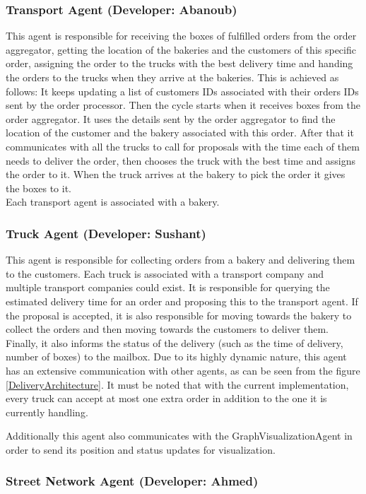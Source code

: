 \documentclass[11pt, a4paper]{article}
\begin{document}
\subsubsection{Transport Agent (Developer: Abanoub)}
This agent is responsible for receiving the boxes of fulfilled orders from the order aggregator, getting the location of the bakeries and the customers of this specific order, assigning the order to the trucks with the best delivery time and handing the orders to the trucks when they arrive at the bakeries. This is achieved as follows: It keeps updating a list of customers IDs associated with their orders IDs sent by the order processor. Then the cycle starts when it receives boxes from the order aggregator. It uses the details sent by the order aggregator to find the location of the customer and the bakery associated with this order. After that it communicates with all the trucks to call for proposals with the time each of them needs to deliver the order, then chooses the truck with the best time and assigns the order to it. When the truck arrives at the bakery to pick the order it gives the boxes to it.\\
Each transport agent is associated with a bakery.
\subsubsection{Truck Agent (Developer: Sushant)}
This agent is responsible for collecting orders from a bakery and delivering them to the customers. Each truck is associated with a transport company and multiple transport companies could exist. It is responsible for querying the estimated delivery time for an order and proposing this to the transport agent. If the proposal is accepted, it is also responsible for moving towards the bakery to collect the orders and then moving towards the customers to deliver them. Finally, it also informs the status of the delivery (such as the time of delivery, number of boxes) to the mailbox. Due to its highly dynamic nature, this agent has an extensive communication with other agents, as can be seen from the figure \ref{DeliveryArchitecture}. It must be noted that with the current implementation, every truck can accept at most one extra order in addition to the one it is currently handling. 
	
Additionally this agent also communicates with the GraphVisualizationAgent in order to send its position and status updates for visualization. 
\subsubsection{Street Network Agent (Developer: Ahmed)}
\end{document}
